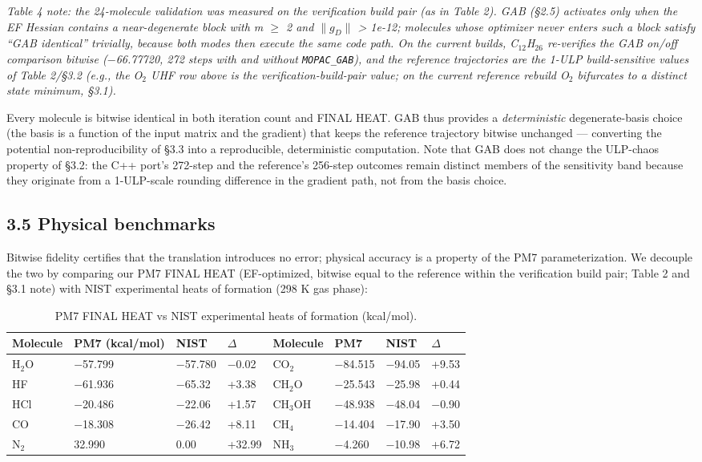 \documentclass[preprint,12pt]{elsarticle}
\begin{document}
\textit{Table 4 note: the 24-molecule validation was measured on the verification build pair (as in Table 2). GAB (\S{}2.5) activates only when the EF Hessian contains a near-degenerate block with m $\geq$ 2 and $\|$$g_D$$\|$ > 1e-12; molecules whose optimizer never enters such a block satisfy ``GAB identical'' trivially, because both modes then execute the same code path. On the current builds, C$_{12}$H$_{26}$ re-verifies the GAB on/off comparison bitwise ($-$66.77720, 272 steps with and without \texttt{MOPAC\_GAB}), and the reference trajectories are the 1-ULP build-sensitive values of Table 2/\S{}3.2 (e.g., the O$_{2}$ UHF row above is the verification-build-pair value; on the current reference rebuild O$_{2}$ bifurcates to a distinct state minimum, \S{}3.1).}

Every molecule is bitwise identical in both iteration count and FINAL HEAT. GAB thus provides a \textit{deterministic} degenerate-basis choice (the basis is a function of the input matrix and the gradient) that keeps the reference trajectory bitwise unchanged --- converting the potential non-reproducibility of \S{}3.3 into a reproducible, deterministic computation. Note that GAB does not change the ULP-chaos property of \S{}3.2: the C++ port's 272-step and the reference's 256-step outcomes remain distinct members of the sensitivity band because they originate from a 1-ULP-scale rounding difference in the gradient path, not from the basis choice.


\subsection{3.5 Physical benchmarks}
Bitwise fidelity certifies that the translation introduces no error; physical accuracy is a property of the PM7 parameterization. We decouple the two by comparing our PM7 FINAL HEAT (EF-optimized, bitwise equal to the reference within the verification build pair; Table 2 and \S{}3.1 note) with NIST experimental heats of formation (298 K gas phase):

\begin{table}[htbp]
\centering
\caption{PM7 FINAL HEAT vs NIST experimental heats of formation (kcal/mol).}
\label{tab:PM7FINALHEATvsNI}
\begin{tabular}{llllllll}
\hline
\textbf{Molecule} & \textbf{PM7 (kcal/mol)} & \textbf{NIST} & \textbf{$\Delta$} & \textbf{Molecule} & \textbf{PM7} & \textbf{NIST} & \textbf{$\Delta$} \\
\hline
H$_{2}$O & $-$57.799 & $-$57.780 & $-$0.02 & CO$_{2}$ & $-$84.515 & $-$94.05 & +9.53 \\
HF & $-$61.936 & $-$65.32 & +3.38 & CH$_{2}$O & $-$25.543 & $-$25.98 & +0.44 \\
HCl & $-$20.486 & $-$22.06 & +1.57 & CH$_{3}$OH & $-$48.938 & $-$48.04 & $-$0.90 \\
CO & $-$18.308 & $-$26.42 & +8.11 & CH$_{4}$ & $-$14.404 & $-$17.90 & +3.50 \\
N$_{2}$ & 32.990 & 0.00 & +32.99 & NH$_{3}$ & $-$4.260 & $-$10.98 & +6.72 \\
\hline
\end{tabular}
\end{table}
\end{document}
